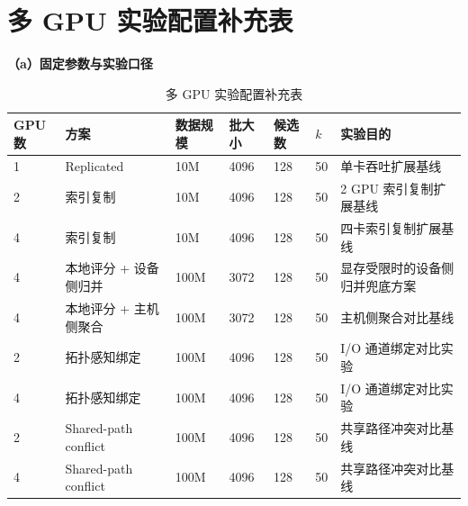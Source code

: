 \Needspace{0.95\textheight}
\section{多 GPU 实验配置补充表}

\begin{table}[!htbp]
  \caption{多 GPU 实验配置补充表}
  \label{tab:multi-gpu-exp-setup}
  \centering
  \small
  \setlength{\tabcolsep}{3pt}
  \renewcommand{\arraystretch}{1.10}
  \textbf{（a）固定参数与实验口径}
  \begin{adjustbox}{max width=\linewidth}
    \begin{tabular}{C{0.9cm}P{3.1cm}C{1.2cm}C{1.2cm}C{1.2cm}C{0.8cm}P{4.3cm}}
      \toprule
      GPU数 & 方案 & 数据规模 & 批大小 & 候选数 & $k$ & 实验目的 \\
       & Replicated & 10M & 4096 & 128 & 50 & 单卡吞吐扩展基线 \\
      2 & 索引复制 & 10M & 4096 & 128 & 50 & 2 GPU 索引复制扩展基线 \\
      4 & 索引复制 & 10M & 4096 & 128 & 50 & 四卡索引复制扩展基线 \\
      4 & 本地评分 + 设备侧归并 & 100M & 3072 & 128 & 50 & 显存受限时的设备侧归并兜底方案 \\
      4 & 本地评分 + 主机侧聚合 & 100M & 3072 & 128 & 50 & 主机侧聚合对比基线 \\
      2 & 拓扑感知绑定 & 100M & 4096 & 128 & 50 & I/O 通道绑定对比实验 \\
      4 & 拓扑感知绑定 & 100M & 4096 & 128 & 50 & I/O 通道绑定对比实验 \\
      2 & Shared-path conflict & 100M & 4096 & 128 & 50 & 共享路径冲突对比基线 \\
      4 & Shared-path conflict & 100M & 4096 & 128 & 50 & 共享路径冲突对比基线 \\
      \bottomrule
    \end{tabular}
  \end{adjustbox}


\end{table}
